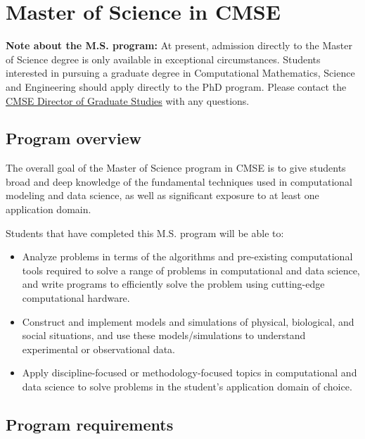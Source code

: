 \section{Master of Science in CMSE}
\label{sec:ms}

\noindent \textbf{Note about the M.S. program:} At present, admission
directly to the Master of Science degree is only available in
exceptional circumstances.  Students interested in pursuing a graduate
degree in Computational Mathematics, Science and Engineering should
apply directly to the PhD program.  Please contact the
\href{mailto:cmsegrad@msu.edu}{CMSE Director of Graduate Studies} with
any questions.


\subsection{Program overview}

The overall goal of the Master of Science program in CMSE is to give students broad and
deep knowledge of the fundamental techniques used in computational
modeling and data science, as well as significant exposure to at least
one application domain.

\vspace{2mm}
\noindent
Students that have completed this M.S. program will be able to:

\begin{itemize}
\item  Analyze problems in terms of the algorithms and pre-existing
  computational tools required to solve a range of problems in
  computational and data science, and write programs to efficiently
  solve the problem using cutting-edge computational hardware.  

\item  Construct and implement models and simulations of physical,
  biological, and social situations, and use these models/simulations
  to understand experimental or observational data.  

\item  Apply discipline-focused or methodology-focused topics in
  computational and data science to solve problems in the student’s
  application domain of choice.


\end{itemize}

\subsection{Program requirements}

